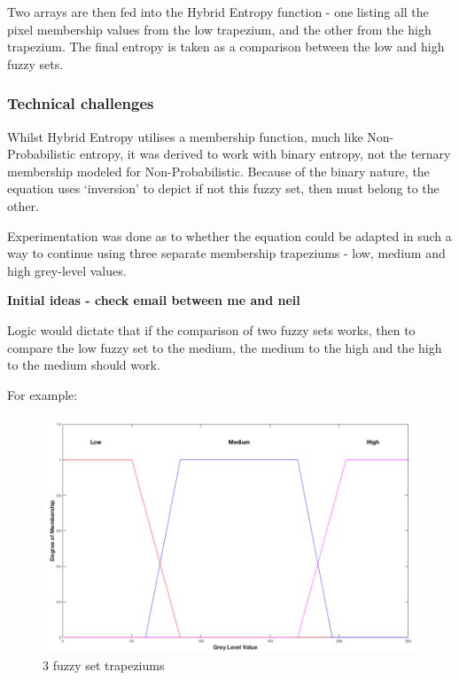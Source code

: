 Two arrays are then fed into the Hybrid Entropy function - one listing all the pixel membership values from the low trapezium, and the other from the high trapezium. The final entropy is taken as a comparison between the low and high fuzzy sets.

\subsubsection{Technical challenges}
\label{sssec:hyrid-technical}

Whilst Hybrid Entropy utilises a membership function, much like Non-Probabilistic entropy, it was derived to work with binary entropy, not the ternary membership modeled for Non-Probabilistic. Because of the binary nature, the equation uses `inversion' to depict if not this fuzzy set, then must belong to the other.

Experimentation was done as to whether the equation could be adapted in such a way to continue using three separate membership trapeziums - low, medium and high grey-level values.

\textbf{Initial ideas - check email between me and neil}


Logic would dictate that if the comparison of two fuzzy sets works, then to compare the low fuzzy set to the medium, the medium to the high and the high to the medium should work.

For example:

\begin{figure}[!ht]
  \centering
  \includegraphics[scale=0.5]{Chapter2/hybrid-img/3_traps.png}
  \caption{3 fuzzy set trapeziums}
  \label{fig:3-traps}
\end{figure}

